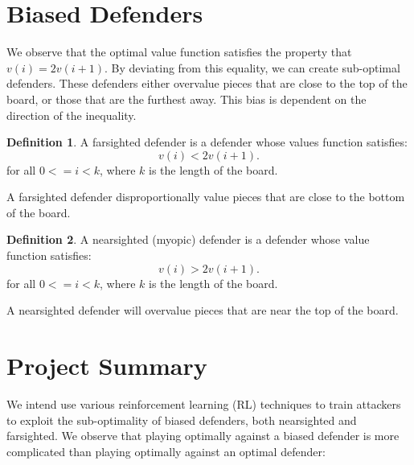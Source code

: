 \documentclass{article}
\theoremstyle{plain}
\theoremstyle{definition}
\newtheorem{defn}{Definition}[section]
\theoremstyle{remark}
\begin{document}

\section{Biased Defenders} %

We observe that the optimal value function satisfies the property that $v(i) = 2v(i+1)$. By deviating from this equality, we can create sub-optimal defenders. These defenders either overvalue pieces that are close to the top of the board, or those that are the furthest away. This bias is dependent on the direction of the inequality.

\begin{defn}
  A farsighted defender is a defender whose values function satisfies:
  \begin{equation}
    v(i) < 2v(i+1).
  \end{equation}
  for all $0 <= i < k$, where $k$ is the length of the board.
\end{defn}

A farsighted defender disproportionally value pieces that are close to the bottom of the board. \\

\begin{defn}
  A nearsighted (myopic) defender is a defender whose value function satisfies:
  \begin{equation}
    v(i) > 2v(i+1).
  \end{equation}
  for all $0 <= i < k$, where $k$ is the length of the board.
\end{defn}

A nearsighted defender will overvalue pieces that are near the top of the board.


\section{Project Summary}

We intend use various reinforcement learning (RL) techniques to train attackers to exploit the sub-optimality of biased defenders, both nearsighted and farsighted. We observe that playing optimally against a biased defender is more complicated than playing optimally against an optimal defender:
\end{document}
